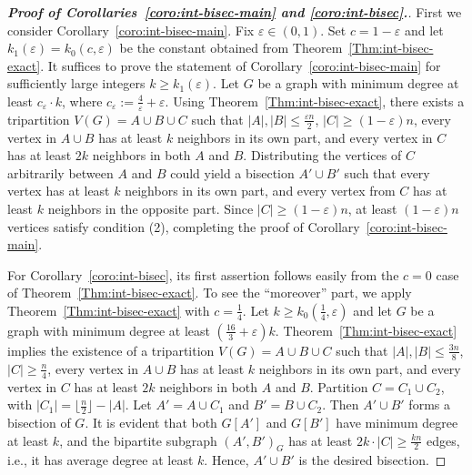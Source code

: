 \documentclass{aic}
\begin{document}
	\begin{proof}[\bf Proof of Corollaries~\ref{coro:int-bisec-main} and \ref{coro:int-bisec}.]
		First we consider Corollary~\ref{coro:int-bisec-main}.
		Fix $\varepsilon\in (0,1)$.
		Set $c=1-\varepsilon$ and let $k_1(\varepsilon)=k_0(c,\varepsilon)$ be the constant obtained from Theorem~\ref{Thm:int-bisec-exact}.
		It suffices to prove the statement of Corollary~\ref{coro:int-bisec-main} for sufficiently large integers $k\geq k_1(\varepsilon)$.
		Let $G$ be a graph with minimum degree at least $c_\varepsilon\cdot k$, where $c_\varepsilon:=\frac{4}{\varepsilon}+\varepsilon$.
		Using Theorem~\ref{Thm:int-bisec-exact}, there exists a tripartition $V(G)=A\cup B\cup C$ such that
		$|A|,|B|\leq \frac{\varepsilon n}{2}$, $|C|\geq (1-\varepsilon)n$,
		every vertex in $A\cup B$ has at least $k$ neighbors in its own part,
		and every vertex in $C$ has at least $2k$ neighbors in both $A$ and $B$.
		Distributing the vertices of $C$ arbitrarily between $A$ and $B$ could yield a bisection $A' \cup B'$
		such that every vertex has at least $k$ neighbors in its own part,
		and every vertex from $C$ has at least $k$ neighbors in the opposite part.
		Since $|C|\geq (1-\varepsilon)n$,
		at least $(1-\varepsilon)n$ vertices satisfy condition (2),
		completing the proof of Corollary~\ref{coro:int-bisec-main}.
		
		For Corollary~\ref{coro:int-bisec},
		its first assertion follows easily from the $c=0$ case of Theorem~\ref{Thm:int-bisec-exact}.
		To see the ``moreover'' part, we apply Theorem~\ref{Thm:int-bisec-exact} with $c=\frac14$.
		Let $k\geq k_0(\frac14,\varepsilon)$ and let $G$ be a graph with minimum degree at least $\left(\frac{16}{3} + \varepsilon\right)k$.
		Theorem~\ref{Thm:int-bisec-exact} implies the existence of a tripartition $V(G)=A\cup B\cup C$ such that $|A|,|B|\leq \frac{3n}{8}$,
		$|C|\geq \frac{n}{4}$, every vertex in $A\cup B$ has at least $k$ neighbors in its own part,
		and every vertex in $C$ has at least $2k$ neighbors in both $A$ and $B$.
		Partition $C=C_1\cup C_2$, with $|C_1|=\lfloor\frac{n}{2}\rfloor-|A|$.
		Let $A'=A\cup C_1$ and $B'=B\cup C_2$.
		Then $A'\cup B'$ forms a bisection of $G$.
		It is evident that both $G[A']$ and $G[B']$ have minimum degree at least $k$,
		and the bipartite subgraph $(A',B')_G$ has at least $2k\cdot |C|\geq \frac{kn}{2}$ edges, i.e., it has average degree at least $k$.
		Hence, $A'\cup B'$ is the desired bisection.
	\end{proof}
	
	
\end{document}

